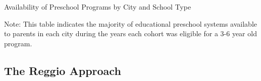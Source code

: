 
\begin{table}[H]
\centering
\caption{Availability of Preschool Programs by City and School Type}\label{tab:itc-pre}
\begin{adjustbox}{width=\textwidth}
\begin{threeparttable}
	
\begin{tablenotes}
Note: This table indicates the majority of educational preschool systems available to parents in each city during the years each cohort was eligible for a 3-6 year old program. 
\end{tablenotes}
\end{threeparttable}
\end{adjustbox}
\end{table}




\subsection{The Reggio Approach}

